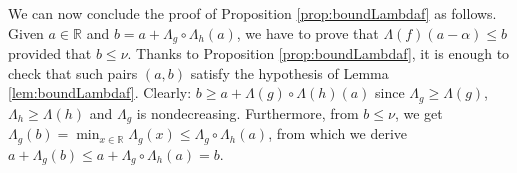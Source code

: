 \documentclass{sig-alternate}
\newcommand{\R}{\mathbb R}
\begin{document}
We can now conclude the proof of Proposition \ref{prop:boundLambdaf} as 
follows. Given $a \in \R$ and $b = a + \Lambda_g \circ \Lambda_h(a)$, we 
have to prove that $\Lambda(f)(a-\alpha) \leq b$ provided that $b \leq 
\nu$. Thanks to Proposition \ref{prop:boundLambdaf}, it is enough to 
check that such pairs $(a,b)$ satisfy the hypothesis of Lemma
\ref{lem:boundLambdaf}. Clearly:
$b \geq a + \Lambda(g) \circ \Lambda(h)(a)$
since $\Lambda_g \geq \Lambda(g)$, $\Lambda_h \geq \Lambda(h)$ and
$\Lambda_g$ is nondecreasing. Furthermore, from $b \leq \nu$, we get
$\Lambda_g(b) = \min_{x \in \R} \Lambda_g(x) \leq \Lambda_g \circ 
\Lambda_h(a)$, from which we derive 
$a + \Lambda_g(b) \leq a + \Lambda_g \circ \Lambda_h(a) = b$.



\end{document}
